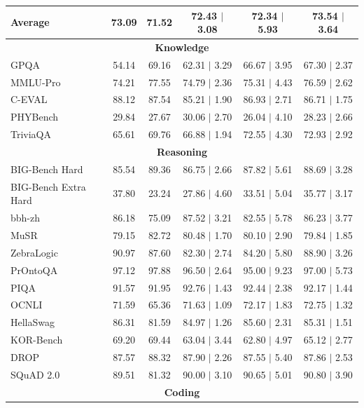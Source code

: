 \begin{table}[htbp]
{\begin{tabular}{lcc|ccc}
\midrule
\textbf{Average}& 73.09 & 71.52 & 72.43 $\mid$ 3.08 & 72.34 $\mid$ 5.93  & 73.54 $\mid$ 3.64 \\
\midrule
\multicolumn{6}{c}{\textbf{Knowledge}} \\
\midrule
GPQA & 54.14 & 69.16 & 62.31 $\mid$ 3.29 & 66.67 $\mid$ 3.95  & 67.30 $\mid$ 2.37 \\
MMLU-Pro & 74.21 & 77.55 & 74.79 $\mid$ 2.36 & 75.31 $\mid$ 4.43  & 76.59 $\mid$ 2.62 \\
C-EVAL & 88.12 & 87.54 & 85.21 $\mid$ 1.90 & 86.93 $\mid$ 2.71  & 86.71 $\mid$ 1.75 \\
PHYBench & 29.84 & 27.67 & 30.06 $\mid$ 2.70 & 26.04 $\mid$ 4.10  & 28.23 $\mid$ 2.66 \\
TriviaQA & 65.61 & 69.76 & 66.88 $\mid$ 1.94 & 72.55 $\mid$ 4.30  & 72.93 $\mid$ 2.92 \\
\midrule
\multicolumn{6}{c}{\textbf{Reasoning}} \\
\midrule
BIG-Bench Hard & 85.54 & 89.36 & 86.75 $\mid$ 2.66 & 87.82 $\mid$ 5.61  & 88.69 $\mid$ 3.28 \\
BIG-Bench Extra Hard & 37.80 & 23.24 & 27.86 $\mid$ 4.60 & 33.51 $\mid$ 5.04 &  35.77 $\mid$ 3.17 \\
bbh-zh & 86.18 & 75.09 & 87.52 $\mid$ 3.21 & 82.55 $\mid$ 5.78  & 86.23 $\mid$ 3.77 \\
MuSR & 79.15 & 82.72 & 80.48 $\mid$ 1.70 & 80.10 $\mid$ 2.90 & 79.84 $\mid$ 1.85 \\
ZebraLogic & 90.97 & 87.60 & 82.30 $\mid$ 2.74 & 84.20 $\mid$ 5.80  & 88.90 $\mid$ 3.26 \\
PrOntoQA & 97.12 & 97.88 & 96.50 $\mid$ 2.64 & 95.00 $\mid$ 9.23  & 97.00 $\mid$ 5.73 \\
PIQA & 91.57 & 91.95 & 92.76 $\mid$ 1.43 & 92.44 $\mid$ 2.38  & 92.17 $\mid$ 1.44 \\
OCNLI & 71.59 & 65.36 & 71.63 $\mid$ 1.09 & 72.17 $\mid$ 1.83  & 72.75 $\mid$ 1.32 \\
HellaSwag & 86.31 & 81.59 & 84.97 $\mid$ 1.26 & 85.60 $\mid$ 2.31  & 85.31 $\mid$ 1.51 \\
KOR-Bench & 69.20 & 69.44 & 63.04 $\mid$ 3.44 & 62.80 $\mid$ 4.97  & 65.12 $\mid$ 2.77 \\
DROP & 87.57 & 88.32 & 87.90 $\mid$ 2.26 & 87.55 $\mid$ 5.40  & 87.86 $\mid$ 2.53 \\
SQuAD 2.0 & 89.51 & 81.32 & 90.00 $\mid$ 3.10 & 90.65 $\mid$ 5.01  & 90.80 $\mid$ 3.90 \\
\midrule
\multicolumn{6}{c}{\textbf{Coding}} \\

\end{tabular}}
\end{table}
